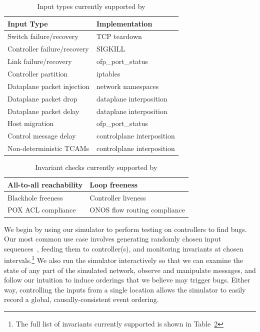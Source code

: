 \begin{table}
\centering
\begin{tabular}{|l|l|}
\hline
Input Type &  Implementation \\
\hline
\hline
Switch failure/recovery & TCP teardown \\
\hline
Controller failure/recovery & SIGKILL \\
\hline
Link failure/recovery & ofp\_port\_status \\
\hline
Controller partition & iptables \\
\hline
Dataplane packet injection & network namespaces \\
\hline
Dataplane packet drop & dataplane interposition \\
\hline
Dataplane packet delay & dataplane interposition \\
\hline
Host migration & ofp\_port\_status \\
\hline
Control message delay & controlplane interposition \\
\hline
Non-deterministic TCAMs & controlplane interposition \\
\hline
\end{tabular}
\caption{Input types currently supported by \projectname}
\label{tab:inputs}
\end{table}

\begin{table}
\centering
\begin{tabular}{|l|l|}
\hline
All-to-all reachability & Loop freeness \\
\hline
Blackhole freeness & Controller liveness \\
\hline
POX ACL compliance & ONOS flow routing compliance \\
\hline
\end{tabular}
\caption{Invariant checks currently supported by \projectname}
\label{tab:invariants}
\end{table}

We begin by using our simulator to perform testing on controllers to find
bugs. Our most common use case involves generating randomly chosen input
sequences~\cite{Miller:1990:ESR:96267.96279}, feeding them to controller(s),
and monitoring
invariants at chosen intervals.\footnote{The full list of invariants currently
supported is shown in Table~\ref{tab:invariants}}
We also run the simulator interactively
so that we can examine the state of any part of the simulated network,
observe and manipulate messages, and follow our
intuition to induce orderings that we believe may trigger bugs.
Either way, controlling the inputs from a single location
allows the simulator to easily record a global, causally-consistent
event ordering.

